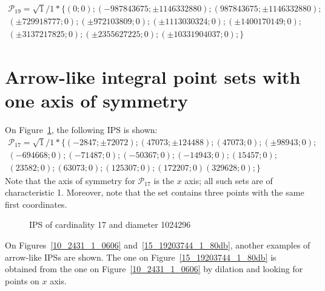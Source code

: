 \documentclass[12pt]{article}
\theoremstyle{theorem}
\theoremstyle{dfn}
\theoremstyle{remark}
\begin{document}
\begin{multline*}
	\mathcal{P}_{19}=
	\sqrt{1}/1*\{
		( 0 ; 0);
		( -987843675 ; \pm1146332880);
		( 987843675 ; \pm1146332880);
		\\
		( \pm729918777 ; 0);
		( \pm972103809 ; 0);
		( \pm1113030324 ; 0);
		( \pm1400170149 ; 0);
		\\
		( \pm3137217825 ; 0);
		( \pm2355627225 ; 0);
		( \pm10331904037 ; 0);
	\}
\end{multline*}

\section{Arrow-like integral point sets with one axis of symmetry}

On Figure~\ref{17_1024296_1_639b}, the following IPS is shown:
\begin{multline}
	\mathcal{P}_{17}=
	\sqrt{1}/1*\{
		( -2847 ; \pm72072);
		( 47073 ; \pm124488);
		( 47073 ; 0);
		( \pm98943 ; 0);
		\\
		( -694668 ; 0);
		( -71487 ; 0);
		( -50367 ; 0);
		( -14943 ; 0);
		( 15457 ; 0);
		\\
		( 23582 ; 0);
		( 63073 ; 0);
		( 125307 ; 0);
		( 172207 ; 0)
		( 329628 ; 0);
	\}
\end{multline}
Note that the axis of symmetry for $\mathcal{P}_{17}$ is the $x$ axis;
all such sets are of characteristic 1.
Moreover, note that the set contains three points with the same first coordinates.

\begin{figure}[h!]
\parbox{1\linewidth}{\caption{IPS of cardinality 17 and diameter 1024296}
\label{17_1024296_1_639b}}
\end{figure}

On Figures~\ref{10_2431_1_0606} and~\ref{15_19203744_1_80db}, another examples of arrow-like IPSs are shown.
The one on Figure~\ref{15_19203744_1_80db} is obtained from the one on Figure~\ref{10_2431_1_0606}
by dilation and looking for points on $x$ axis.
\end{document}
